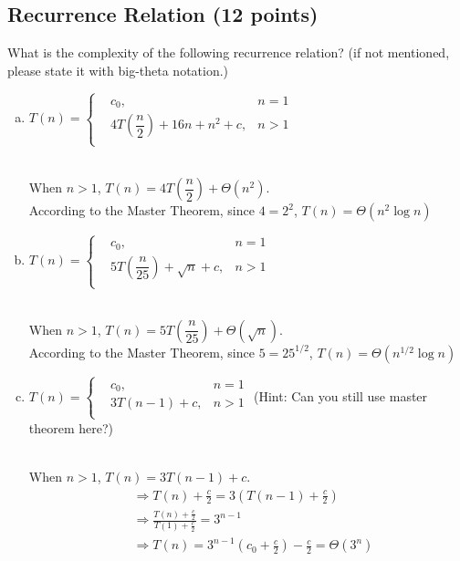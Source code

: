 \documentclass[11pt]{exam}
\begin{document}
\subsection{Recurrence Relation (12 points)}
What is the complexity of the following recurrence relation? (if not mentioned, please state it with big-theta notation.)
\begin{enumerate}[(a)]

\item $T(n) = \left\{
\begin{aligned}
&c_0, &n=1\\
&4T\left(\dfrac{n}{2}\right)+16n+n^2+c, &n>1\\
\end{aligned}
\right.
$

\begin{solution}
\\
When $n>1$, $T(n)=4T\left(\dfrac{n}{2}\right)+\Theta(n^{2})$.\\
According to the Master Theorem, since $4=2^{2}$, $T(n)=\Theta(n^{2}\log n)$
\end{solution}

\item $T(n) = \left\{
\begin{aligned}
&c_0, &n=1\\
&5T\left(\dfrac{n}{25}\right)+\sqrt{n}+c, &n>1\\
\end{aligned}
\right.
$

\begin{solution}
\\
When $n>1$, $T(n)=5T\left(\dfrac{n}{25}\right)+\Theta(\sqrt{n})$.\\
According to the Master Theorem, since $5=25^{1/2}$, $T(n)=\Theta(n^{1/2}\log n)$
\end{solution}

\item $T(n) = \left\{
\begin{aligned}
&c_0, &n=1\\
&3T(n-1)+c, &n>1\\
\end{aligned}
\right.
$ (Hint: Can you still use master theorem here?)
\begin{solution}
\\
When $n>1$, $T(n)=3T(n-1)+c$.\\
\begin{equation*}
    \begin{aligned}
    &\Rightarrow T(n)+\frac{c}{2} = 3(T(n-1)+\frac{c}{2}) \\
    &\Rightarrow \frac{T(n)+\frac{c}{2}}{T(1)+\frac{c}{2}} = 3^{n-1} \\
    &\Rightarrow T(n) = 3^{n-1}(c_{0}+\frac{c}{2})-\frac{c}{2} = \Theta(3^{n})
    \end{aligned}
\end{equation*}

\end{solution}
\end{enumerate}
\end{document}
